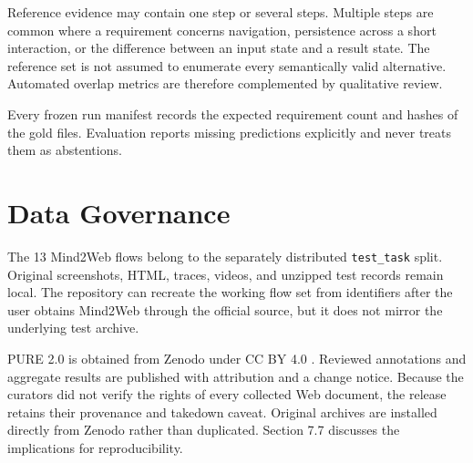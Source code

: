Reference evidence may contain one step or several steps. Multiple steps are
common where a requirement concerns navigation, persistence across a short
interaction, or the difference between an input state and a result state. The
reference set is not assumed to enumerate every semantically valid alternative.
Automated overlap metrics are therefore complemented by qualitative review.

Every frozen run manifest records the expected requirement count and hashes of
the gold files. Evaluation reports missing predictions explicitly and never
treats them as abstentions.

\section{Data Governance}\label{data-governance}

The 13 Mind2Web flows belong to the separately distributed \texttt{test\_task} split.
Original screenshots, HTML, traces, videos, and unzipped test records remain
local. The repository can recreate the working flow set from identifiers after
the user obtains Mind2Web through the official source, but it does not mirror
the underlying test archive.

PURE 2.0 is obtained from Zenodo under CC BY 4.0 \autocite{purezenodo2018}. Reviewed
annotations and aggregate results are published with attribution and a change
notice. Because the curators did not verify the rights of every collected Web
document, the release retains their provenance and takedown caveat. Original
archives are installed directly from Zenodo rather than duplicated. Section 7.7
discusses the implications for reproducibility.
